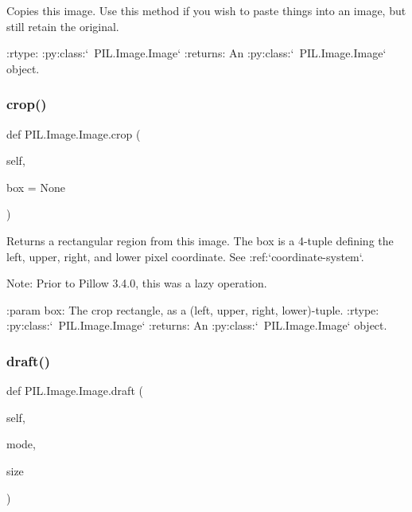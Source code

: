 \begin{DoxyVerb}Copies this image. Use this method if you wish to paste things
into an image, but still retain the original.

:rtype: :py:class:`~PIL.Image.Image`
:returns: An :py:class:`~PIL.Image.Image` object.
\end{DoxyVerb}
 \mbox{\label{classPIL_1_1Image_1_1Image_aa62a2de91c9b9bd1194dd0d0f4f759cb}} 
\subsubsection{\texorpdfstring{crop()}{crop()}}
{\footnotesize\ttfamily def P\+I\+L.\+Image.\+Image.\+crop (\begin{DoxyParamCaption}\item[{}]{self,  }\item[{}]{box = {\ttfamily None} }\end{DoxyParamCaption})}

\begin{DoxyVerb}Returns a rectangular region from this image. The box is a
4-tuple defining the left, upper, right, and lower pixel
coordinate. See :ref:`coordinate-system`.

Note: Prior to Pillow 3.4.0, this was a lazy operation.

:param box: The crop rectangle, as a (left, upper, right, lower)-tuple.
:rtype: :py:class:`~PIL.Image.Image`
:returns: An :py:class:`~PIL.Image.Image` object.
\end{DoxyVerb}
 \mbox{\label{classPIL_1_1Image_1_1Image_ac6f0064e4cfca9baceaba8198856c1e3}} 
\subsubsection{\texorpdfstring{draft()}{draft()}}
{\footnotesize\ttfamily def P\+I\+L.\+Image.\+Image.\+draft (\begin{DoxyParamCaption}\item[{}]{self,  }\item[{}]{mode,  }\item[{}]{size }\end{DoxyParamCaption})}

